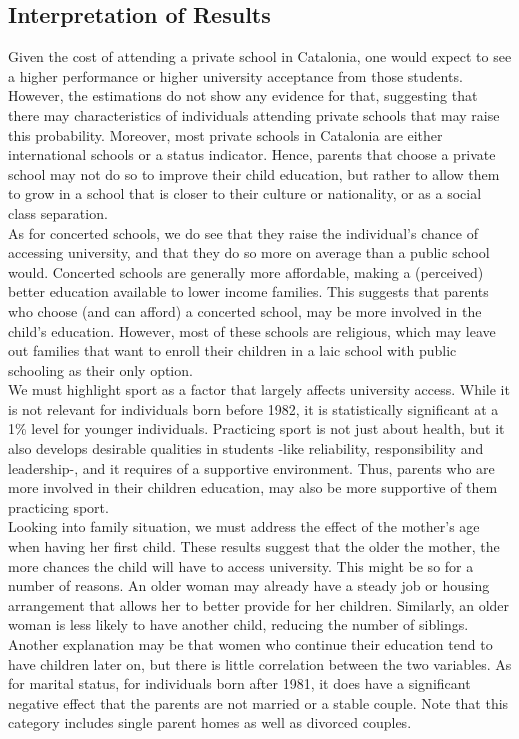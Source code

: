 \documentclass[12pt]{article}
\begin{document}
\subsection{Interpretation of Results}
Given the cost of attending a private school in Catalonia, one would expect to see a higher performance or higher university acceptance from those students. However, the estimations do not show any evidence for that, suggesting that there may characteristics of individuals attending private schools that may raise this probability. Moreover, most private schools in Catalonia are either international schools or a status indicator. Hence, parents that choose a private school may not do so to improve their child education, but rather to allow them to grow in a school that is closer to their culture or nationality, or as a social class separation.\\
As for concerted schools, we do see that they raise the individual's chance of accessing university, and that they do so more on average than a public school would. Concerted schools are generally more affordable, making a (perceived) better education available to lower income families. This suggests that parents who choose (and can afford) a concerted school, may be more involved in the child's education. However, most of these schools are religious, which may leave out families that want to enroll their children in a laic school with public schooling as their only option. \\
We must highlight sport as a factor that largely affects university access. While it is not relevant for individuals born before 1982, it is statistically significant at a 1\% level for younger individuals. Practicing sport is not just about health, but it also develops desirable qualities in students -like reliability, responsibility and leadership-, and it requires of a supportive environment. Thus, parents who are more involved in their children education, may also be more supportive of them practicing sport.\\
Looking into family situation, we must address the effect of the mother's age when having her first child. These results suggest that the older the mother, the more chances the child will have to access university. This might be so for a number of reasons. An older woman may already have a steady job or housing arrangement that allows her to better provide for her children. Similarly, an older woman is less likely to have another child, reducing the number of siblings. Another explanation may be that women who continue their education tend to have children later on, but there is little correlation between the two variables. As for marital status, for individuals born after 1981, it does have a significant negative effect that the parents are not married or a stable couple. Note that this category includes single parent homes as well as divorced couples.\\
\end{document}
